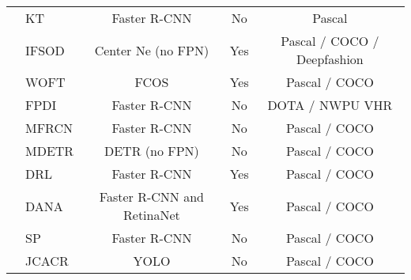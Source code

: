 \begin{table}[h]
\begin{adjustbox}{width=0.75\textwidth}
\begin{tabular}{@{}llccc}
            \cellcolor{white}                                                                    & KT    \parencite{kim2020few}                      & Faster R-CNN               & No                          & Pascal                             \\
            \cellcolor{white}                                                                    & IFSOD \parencite{ganea2021incremental}            & Center Ne (no FPN)         & Yes                         & Pascal / COCO / Deepfashion        \\
            \cellcolor{white}                                                                    & WOFT  \parencite{li2020one}                       & FCOS                       & Yes                         & Pascal / COCO                      \\
            \cellcolor{white}                                                                    & FPDI  \parencite{gao2021fast}                     & Faster R-CNN               & No                          & DOTA /  NWPU VHR                   \\
            \cellcolor{white}                                                                    & MFRCN \parencite{han2021meta}                     & Faster R-CNN               & No                          & Pascal / COCO                      \\
            \cellcolor{white}                                                                    & MDETR \parencite{zhang2021meta}                   & DETR (no FPN)              & No                          & Pascal / COCO                      \\
            \cellcolor{white}                                                                    & DRL   \parencite{liu2021dynamic}                  & Faster R-CNN               & Yes                         & Pascal / COCO                      \\
            \cellcolor{white}                                                                    & DANA  \parencite{chen2021should}                  & Faster R-CNN and RetinaNet & Yes                         & Pascal / COCO                      \\
            \cellcolor{white}                                                                    & SP    \parencite{xu2021few}                       & Faster R-CNN               & No                          & Pascal / COCO                      \\
            \cellcolor{white}                                                                    & JCACR \parencite{chu2021joint}                    & YOLO                       & No                          & Pascal / COCO                      \\

\end{tabular}
\end{adjustbox}
\end{table}
